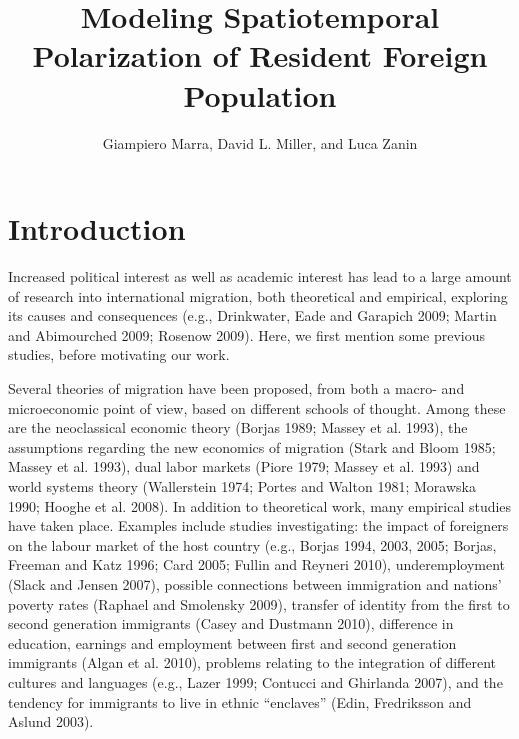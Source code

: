 \documentclass[10pt]{article}
\theoremstyle{definition}
\theoremstyle{plain}
\begin{document}
\title{Modeling Spatiotemporal Polarization of Resident Foreign Population}

\author{Giampiero Marra, David L. Miller, and Luca Zanin
}

\maketitle








\section{Introduction \label{IN}}

Increased political interest as well as academic interest has lead to a large amount of research into international migration, both theoretical and empirical, exploring its causes and consequences (e.g., Drinkwater, Eade and Garapich 2009; Martin and Abimourched 2009; Rosenow 2009). Here, we first mention some previous studies, before motivating our work.

Several theories of migration have been proposed, from both a macro- and microeconomic point of view, based on different schools of thought. Among these are the neoclassical economic theory (Borjas 1989; Massey et al. 1993), the assumptions regarding the new economics of migration (Stark and Bloom 1985; Massey et al. 1993), dual labor markets (Piore 1979; Massey et al. 1993) and world systems theory (Wallerstein 1974; Portes and Walton 1981; Morawska 1990; Hooghe et al. 2008). In addition to theoretical work, many empirical studies have taken place. Examples include studies investigating: the impact of foreigners on the labour market of the host country (e.g., Borjas 1994, 2003, 2005; Borjas, Freeman and Katz 1996; Card 2005; Fullin and Reyneri 2010), underemployment (Slack and Jensen 2007), possible connections between immigration and nations' poverty rates (Raphael and Smolensky 2009), transfer of identity from the first to second generation immigrants (Casey and Dustmann 2010), difference in education, earnings and employment between first and second generation immigrants (Algan et al. 2010), problems relating to the integration of different cultures and languages (e.g., Lazer 1999; Contucci and Ghirlanda 2007), and the tendency for immigrants to live in ethnic ``enclaves'' (Edin, Fredriksson and Aslund 2003). 
  
\end{document}
